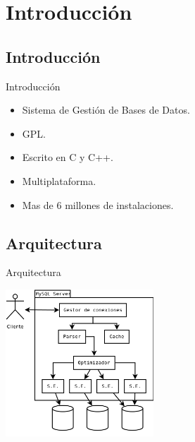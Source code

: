 \section{Introducción}

\subsection{Introducción}
\begin{frame}{Introducción}
  \begin{itemize}
    \item Sistema de Gestión de Bases de Datos.
    \item GPL.
    \item Escrito en C y C++.
    \item Multiplataforma.
    \item Mas de 6 millones de instalaciones.
  \end{itemize}
\end{frame}

\subsection{Arquitectura}
\begin{frame}{Arquitectura}
  \begin{center}
    \includegraphics[height=5.5cm]{imgs/arch.png}
  \end{center}
\end{frame}
